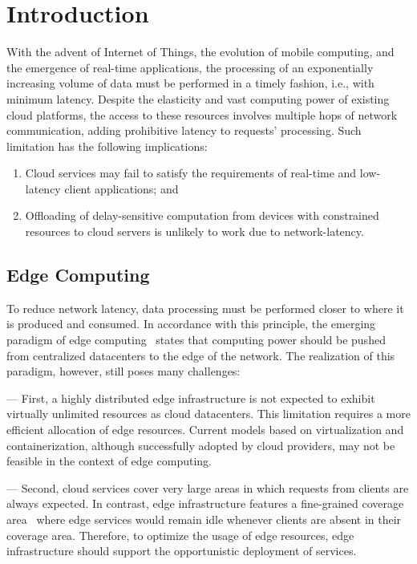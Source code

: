 \section{Introduction}

With the advent of Internet of Things, the evolution of mobile computing, and the emergence of real-time applications, the processing of an exponentially increasing volume of data must be performed in a timely fashion, i.e., with minimum latency. Despite the elasticity and vast computing power of existing cloud platforms, the access to these resources involves multiple hops of network communication, adding prohibitive latency to requests' processing. Such limitation has the following implications:

\begin{enumerate}

\item Cloud services may fail to satisfy the requirements of real-time and low-latency client applications; and

\item Offloading of delay-sensitive computation from devices with constrained resources to cloud servers is unlikely to work due to network-latency.

\end{enumerate}

\subsection{Edge Computing}

To reduce network latency, data processing must be performed closer to where it is produced and consumed. In accordance with this principle, the emerging paradigm of edge computing~\cite{} states that computing power should be pushed from centralized datacenters to the edge of the network. The realization of this paradigm, however, still poses many challenges:

%
--- First, a highly distributed edge infrastructure is not expected to exhibit virtually unlimited resources as cloud datacenters. This limitation requires a more efficient allocation of edge resources. Current models based on virtualization and containerization, although successfully adopted by cloud providers, may not be feasible in the context of edge computing.

--- Second, cloud services cover very large areas in which requests from clients are always expected. In contrast, edge infrastructure features a fine-grained coverage area~\cite{Dehos14millimeter5g} where edge services would remain idle whenever clients are absent in their coverage area. Therefore, to optimize the usage of edge resources, edge infrastructure should support the opportunistic deployment of services.

